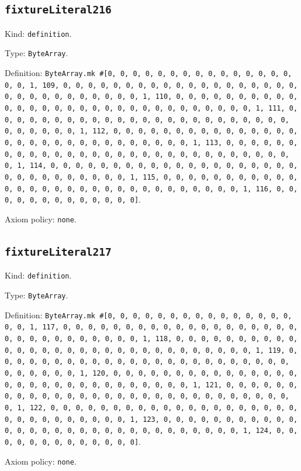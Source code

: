 \documentclass[11pt]{article}
\begin{document}
\subsection*{\texttt{fixtureLiteral216}}
\noindent Kind: \texttt{definition}.\par
\noindent Type: \texttt{ByteArray}.\par
\noindent Definition: \texttt{ByteArray.mk \#[0, 0, 0, 0, 0, 0, 0, 0, 0, 0, 0, 0, 0, 0, 0, 0, 0, 1, 109, 0, 0, 0, 0, 0, 0, 0, 0, 0, 0, 0, 0, 0, 0, 0, 0, 0, 0, 0, 0, 0, 0, 0, 0, 0, 0, 0, 0, 0, 0, 1, 110, 0, 0, 0, 0, 0, 0, 0, 0, 0, 0, 0, 0, 0, 0, 0, 0, 0, 0, 0, 0, 0, 0, 0, 0, 0, 0, 0, 0, 0, 0, 1, 111, 0, 0, 0, 0, 0, 0, 0, 0, 0, 0, 0, 0, 0, 0, 0, 0, 0, 0, 0, 0, 0, 0, 0, 0, 0, 0, 0, 0, 0, 0, 1, 112, 0, 0, 0, 0, 0, 0, 0, 0, 0, 0, 0, 0, 0, 0, 0, 0, 0, 0, 0, 0, 0, 0, 0, 0, 0, 0, 0, 0, 0, 0, 1, 113, 0, 0, 0, 0, 0, 0, 0, 0, 0, 0, 0, 0, 0, 0, 0, 0, 0, 0, 0, 0, 0, 0, 0, 0, 0, 0, 0, 0, 0, 0, 1, 114, 0, 0, 0, 0, 0, 0, 0, 0, 0, 0, 0, 0, 0, 0, 0, 0, 0, 0, 0, 0, 0, 0, 0, 0, 0, 0, 0, 0, 0, 0, 1, 115, 0, 0, 0, 0, 0, 0, 0, 0, 0, 0, 0, 0, 0, 0, 0, 0, 0, 0, 0, 0, 0, 0, 0, 0, 0, 0, 0, 0, 0, 0, 1, 116, 0, 0, 0, 0, 0, 0, 0, 0, 0, 0, 0, 0, 0]}.\par
\noindent Axiom policy: \texttt{none}.\par
\subsection*{\texttt{fixtureLiteral217}}
\noindent Kind: \texttt{definition}.\par
\noindent Type: \texttt{ByteArray}.\par
\noindent Definition: \texttt{ByteArray.mk \#[0, 0, 0, 0, 0, 0, 0, 0, 0, 0, 0, 0, 0, 0, 0, 0, 0, 1, 117, 0, 0, 0, 0, 0, 0, 0, 0, 0, 0, 0, 0, 0, 0, 0, 0, 0, 0, 0, 0, 0, 0, 0, 0, 0, 0, 0, 0, 0, 0, 1, 118, 0, 0, 0, 0, 0, 0, 0, 0, 0, 0, 0, 0, 0, 0, 0, 0, 0, 0, 0, 0, 0, 0, 0, 0, 0, 0, 0, 0, 0, 0, 1, 119, 0, 0, 0, 0, 0, 0, 0, 0, 0, 0, 0, 0, 0, 0, 0, 0, 0, 0, 0, 0, 0, 0, 0, 0, 0, 0, 0, 0, 0, 0, 1, 120, 0, 0, 0, 0, 0, 0, 0, 0, 0, 0, 0, 0, 0, 0, 0, 0, 0, 0, 0, 0, 0, 0, 0, 0, 0, 0, 0, 0, 0, 0, 1, 121, 0, 0, 0, 0, 0, 0, 0, 0, 0, 0, 0, 0, 0, 0, 0, 0, 0, 0, 0, 0, 0, 0, 0, 0, 0, 0, 0, 0, 0, 0, 1, 122, 0, 0, 0, 0, 0, 0, 0, 0, 0, 0, 0, 0, 0, 0, 0, 0, 0, 0, 0, 0, 0, 0, 0, 0, 0, 0, 0, 0, 0, 0, 1, 123, 0, 0, 0, 0, 0, 0, 0, 0, 0, 0, 0, 0, 0, 0, 0, 0, 0, 0, 0, 0, 0, 0, 0, 0, 0, 0, 0, 0, 0, 0, 1, 124, 0, 0, 0, 0, 0, 0, 0, 0, 0, 0, 0, 0, 0]}.\par
\noindent Axiom policy: \texttt{none}.\par
\end{document}

